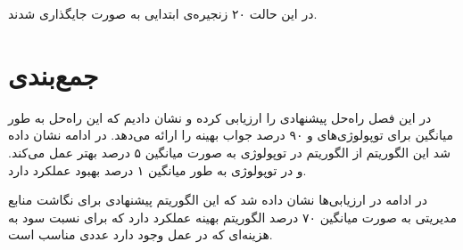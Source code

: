 در این حالت ۲۰ زنجیره‌ی ابتدایی به صورت 
جایگذاری شدند.


\section{جمع‌بندی}
در این فصل راه‌حل پیشنهادی را ارزیابی کرده و نشان دادیم
که این راه‌حل به طور میانگین برای توپولوژی‌های  و 
۹۰ درصد جواب بهینه را ارائه می‌دهد.
در ادامه نشان داده شد این الگوریتم از الگوریتم \cite{Bari2015}
در توپولوژی 
به صورت میانگین ۵ درصد بهتر عمل می‌کند.
و در توپولوژی 
به طور میانگین ۱ درصد بهبود عملکرد دارد.

در ادامه در ارزیابی‌ها نشان داده شد که این الگوریتم پیشنهادی برای نگاشت منابع مدیریتی
به صورت میانگین ۷۰ درصد الگوریتم بهینه عملکرد دارد
که برای نسبت سود به هزینه‌ای که در عمل وجود دارد عددی مناسب است.
